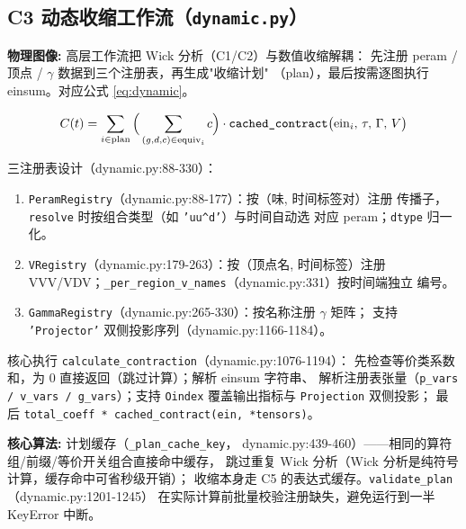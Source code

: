 \documentclass[UTF8]{ctexart}
\begin{document}
\subsection{C3 动态收缩工作流（\texttt{dynamic.py}）}

\begin{physbox}
\textbf{物理图像:} 高层工作流把 Wick 分析（C1/C2）与数值收缩解耦：
先注册 peram / 顶点 / $\gamma$ 数据到三个注册表，再生成"收缩计划"
（plan），最后按需逐图执行 einsum。对应公式 \eqref{eq:dynamic}。
\end{physbox}

\begin{equation}\label{eq:dynamic}
C(t) = \sum_{i \in \rm plan} \Big(\sum_{(g,d,c)\in \mathrm{equiv}_i} c\Big)
\cdot \texttt{cached\_contract}\big(\mathrm{ein}_i,\, \tau,\, \Gamma,\, V\big)
\end{equation}

三注册表设计（dynamic.py:88-330）：

\begin{enumerate}
\item \texttt{PeramRegistry}（dynamic.py:88-177）：按（味, 时间标签对）注册
传播子，\texttt{resolve} 时按组合类型（如 \texttt{'uu\^{}d'}）与时间自动选
对应 peram；\texttt{dtype} 归一化。
\item \texttt{VRegistry}（dynamic.py:179-263）：按（顶点名, 时间标签）注册
VVV/VDV；\texttt{\_per\_region\_v\_names}（dynamic.py:331）按时间端独立
编号。
\item \texttt{GammaRegistry}（dynamic.py:265-330）：按名称注册 $\gamma$ 矩阵；
支持 \texttt{'Projector'} 双侧投影序列（dynamic.py:1166-1184）。
\end{enumerate}

核心执行 \texttt{calculate\_contraction}（dynamic.py:1076-1194）：
先检查等价类系数和，为 0 直接返回（跳过计算）；解析 einsum 字符串、
解析注册表张量（\texttt{p\_vars / v\_vars / g\_vars}）；支持
\texttt{Oindex} 覆盖输出指标与 \texttt{Projection} 双侧投影；
最后 \texttt{total\_coeff * cached\_contract(ein, *tensors)}。

\begin{algobox}
\textbf{核心算法:} 计划缓存（\texttt{\_plan\_cache\_key}，
dynamic.py:439-460）——相同的算符组/前缀/等价开关组合直接命中缓存，
跳过重复 Wick 分析（Wick 分析是纯符号计算，缓存命中可省秒级开销）；
收缩本身走 C5 的表达式缓存。\texttt{validate\_plan}（dynamic.py:1201-1245）
在实际计算前批量校验注册缺失，避免运行到一半 KeyError 中断。
\end{algobox}
\end{document}

